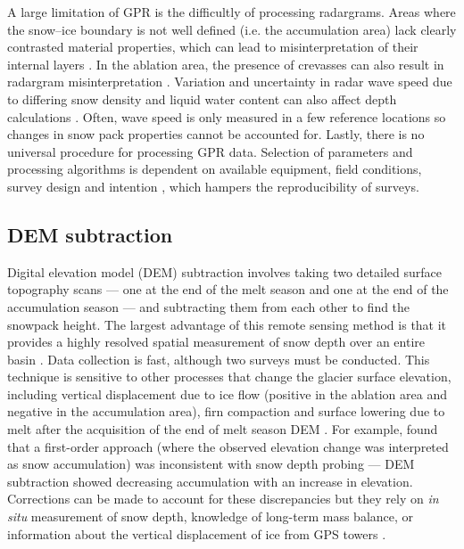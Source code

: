 \documentclass{sfuthesis}
\begin{document}
\begin{appendices}
A large limitation of GPR is the difficultly of processing radargrams. Areas where the snow--ice boundary is not well defined (i.e. the accumulation area) lack clearly contrasted material properties, which can lead to misinterpretation of their internal layers \citep{McGrath2015}. In the ablation area, the presence of crevasses can also result in radargram misinterpretation \citep{Machguth2006}. Variation and uncertainty in radar wave speed due to differing snow density and liquid water content can also affect depth calculations \citep{Sold2013}. Often, wave speed is only measured in a few reference locations so changes in snow pack properties cannot be accounted for. Lastly, there is no universal procedure for processing GPR data. Selection of parameters and processing algorithms is dependent on available equipment, field conditions, survey design and intention \citep{Sold2013}, which hampers the reproducibility of surveys.

\subsection{DEM subtraction}

Digital elevation model (DEM) subtraction involves taking two detailed surface topography scans --- one at the end of the melt season and one at the end of the accumulation season --- and subtracting them from each other to find the snowpack height. The largest advantage of this remote sensing method is that it provides a highly resolved spatial measurement of snow depth over an entire basin \citep{Deems2006, Sold2013}. Data collection is fast, although two surveys must be conducted. This technique is sensitive to other processes that change the glacier surface elevation, including vertical displacement due to ice flow (positive in the ablation area and negative in the accumulation area), firn compaction and surface lowering due to melt after the acquisition of the end of melt season DEM \citep{Sold2013}. For example, \citep{Sold2013} found that a first-order approach (where the observed elevation change was interpreted as snow accumulation) was inconsistent with snow depth probing --- DEM subtraction showed decreasing accumulation with an increase in elevation. Corrections can be made to account for these discrepancies but they rely on \textit{in situ} measurement of snow depth, knowledge of long-term mass balance, or information about the vertical displacement of ice from GPS towers \citep{Sold2013}. 


\end{appendices}
\end{document}
